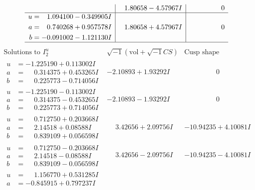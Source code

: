 \documentclass[1p]{elsarticle_modified}
\theoremstyle{definition}
\newcommand{\I}{\sqrt{-1}}
\begin{document}
$$\begin{array}{c|c|c}
 & \phantom{-}1.80658 - 4.57967 I & \phantom{-0.000000 } 0 \\ \hline\begin{aligned}
u &= \phantom{-}1.094100 - 0.349905 I \\
a &= \phantom{-}0.740268 + 0.957578 I \\
b &= -0.091002 - 1.121130 I\end{aligned}
 & \phantom{-}1.80658 + 4.57967 I & \phantom{-0.000000 } 0\\
 \hline 
 \end{array}$$\newpage$$\begin{array}{c|c|c}  
\text{Solutions to }I^u_{2}& \I (\text{vol} + \sqrt{-1}CS) & \text{Cusp shape}\\
 \hline 
\begin{aligned}
u &= -1.225190 + 0.113002 I \\
a &= \phantom{-}0.314375 + 0.453265 I \\
b &= \phantom{-}0.225773 - 0.714056 I\end{aligned}
 & -2.10893 + 1.93292 I & \phantom{-0.000000 } 0 \\ \hline\begin{aligned}
u &= -1.225190 - 0.113002 I \\
a &= \phantom{-}0.314375 - 0.453265 I \\
b &= \phantom{-}0.225773 + 0.714056 I\end{aligned}
 & -2.10893 - 1.93292 I & \phantom{-0.000000 } 0 \\ \hline\begin{aligned}
u &= \phantom{-}0.712750 + 0.203668 I \\
a &= \phantom{-}2.14518 + 0.08588 I \\
b &= \phantom{-}0.839109 + 0.056598 I\end{aligned}
 & \phantom{-}3.42656 + 2.09756 I & -10.94235 + 4.10081 I \\ \hline\begin{aligned}
u &= \phantom{-}0.712750 - 0.203668 I \\
a &= \phantom{-}2.14518 - 0.08588 I \\
b &= \phantom{-}0.839109 - 0.056598 I\end{aligned}
 & \phantom{-}3.42656 - 2.09756 I & -10.94235 - 4.10081 I \\ \hline\begin{aligned}
u &= \phantom{-}1.156770 + 0.531285 I \\
a &= -0.845915 + 0.797237 I \\

\end{aligned}
\end{array}$$
\end{document}
